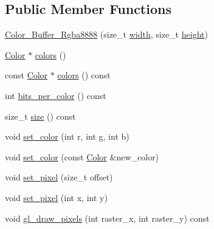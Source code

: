 \subsection*{Public Member Functions}
\begin{DoxyCompactItemize}
\item 
\mbox{\hyperlink{classexample_1_1_color___buffer___rgba8888_aa5397ac3ceb62d95d0f4773205d98177}{Color\+\_\+\+Buffer\+\_\+\+Rgba8888}} (size\+\_\+t \mbox{\hyperlink{classexample_1_1_color___buffer_ab61454d4b35cbba00d2e634d14ed20ac}{width}}, size\+\_\+t \mbox{\hyperlink{classexample_1_1_color___buffer_ae01f4538ee30af1d3072a425c5ad37ac}{height}})
\item 
\mbox{\hyperlink{structexample_1_1_color___buffer___rgba8888_1_1_color}{Color}} $\ast$ \mbox{\hyperlink{classexample_1_1_color___buffer___rgba8888_aec3a6be699750106d4a9ccd5f7f75f74}{colors}} ()
\item 
const \mbox{\hyperlink{structexample_1_1_color___buffer___rgba8888_1_1_color}{Color}} $\ast$ \mbox{\hyperlink{classexample_1_1_color___buffer___rgba8888_aea57e24bede44fa736473824e8f14a1f}{colors}} () const
\item 
int \mbox{\hyperlink{classexample_1_1_color___buffer___rgba8888_ab2e7a20a9dd24c5dd422d143d9a2d391}{bits\+\_\+per\+\_\+color}} () const
\item 
size\+\_\+t \mbox{\hyperlink{classexample_1_1_color___buffer___rgba8888_a635f30dda6b8e1851b444ff6e0d2a092}{size}} () const
\item 
void \mbox{\hyperlink{classexample_1_1_color___buffer___rgba8888_a408bf6adf54fc9958b74d21c8f6da178}{set\+\_\+color}} (int r, int g, int b)
\item 
void \mbox{\hyperlink{classexample_1_1_color___buffer___rgba8888_a5033d0d18293c92936fd2ff5318e3f0f}{set\+\_\+color}} (const \mbox{\hyperlink{structexample_1_1_color___buffer___rgba8888_1_1_color}{Color}} \&new\+\_\+color)
\item 
void \mbox{\hyperlink{classexample_1_1_color___buffer___rgba8888_ac741fa7bca9b980a475e6f7033b64347}{set\+\_\+pixel}} (size\+\_\+t offset)
\item 
void \mbox{\hyperlink{classexample_1_1_color___buffer___rgba8888_aceb94fbc6797177c5a401f4d10d56766}{set\+\_\+pixel}} (int x, int y)
\item 
void \mbox{\hyperlink{classexample_1_1_color___buffer___rgba8888_a66e133b6fd196f02a0ba454dd3fc550f}{gl\+\_\+draw\+\_\+pixels}} (int raster\+\_\+x, int raster\+\_\+y) const
\end{DoxyCompactItemize}

